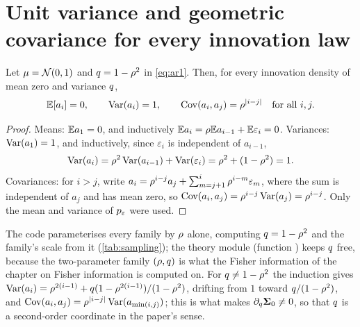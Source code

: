 \section{Unit variance and geometric covariance for every innovation law}

\begin{proposition}
\label{prop:second-order}
Let $\mu=\mathcal{N}\!\left(0,1\right)$ and $q=1-\rho^2$ in \cref{eq:ar1}. Then, for every innovation
density of mean zero and variance $q$,
\begin{equation}
  \mathbb{E}[a_i]=0,\qquad \operatorname{Var}(a_i)=1,\qquad \operatorname{Cov}(a_i,a_j)=\rho^{|i-j|}\quad\text{for all }i,j .
  \label{eq:covariance}
\end{equation}
\end{proposition}
\begin{proof}
Means: $\mathbb{E} a_1=0$, and inductively $\mathbb{E} a_i=\rho\mathbb{E} a_{i-1}+\mathbb{E}\varepsilon_i=0$.
Variances: $\operatorname{Var}(a_1)=1$, and inductively, since $\varepsilon_i$ is independent of
$a_{i-1}$,
\[
  \operatorname{Var}(a_i)=\rho^2\operatorname{Var}(a_{i-1})+\operatorname{Var}(\varepsilon_i)=\rho^2+(1-\rho^2)=1 .
\]
Covariances: for $i>j$, write $a_i=\rho^{i-j}a_j+\sum_{m=j+1}^{i}\rho^{i-m}\varepsilon_m$,
where the sum is independent of $a_j$ and has mean zero, so
$\operatorname{Cov}(a_i,a_j)=\rho^{i-j}\operatorname{Var}(a_j)=\rho^{i-j}$. Only the mean and variance of $p_{\varepsilon}$
were used.
\end{proof}


The code parameterises every family by $\rho$ alone, computing $q=1-\rho^2$ and
the family's scale from it (\cref{tab:sampling}); the theory module
 (function ) keeps $q$
free, because the two-parameter family $(\rho,q)$ is what the Fisher information
of the chapter on Fisher information is computed on. For $q\ne1-\rho^2$ the
induction gives $\operatorname{Var}(a_i)=\rho^{2(i-1)}+q(1-\rho^{2(i-1)})/(1-\rho^2)$, drifting from
$1$ toward $q/(1-\rho^2)$, and $\operatorname{Cov}(a_i,a_j)=\rho^{|i-j|}\operatorname{Var}(a_{\min(i,j)})$; this
is what makes $\partial_q\mathbf{\Sigma}_0\ne0$, so that $q$ is a second-order coordinate
in the paper's sense.

